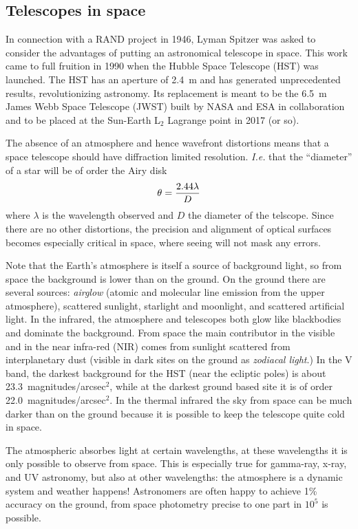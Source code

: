\subsection{Telescopes in space}

In connection with a RAND project in 1946, Lyman Spitzer was asked to consider the advantages
of putting an astronomical telescope in space. This work came to full fruition in 1990 
when the Hubble Space Telescope (HST) was launched. The HST has an aperture of 2.4~m and
has generated unprecedented results, revolutionizing astronomy. Its replacement is meant to
be the 6.5~m James Webb Space Telescope (JWST) built by NASA and ESA in collaboration and to
be placed at the Sun-Earth L$_2$ Lagrange point in 2017 (or so).

The absence of an atmosphere and hence wavefront distortions means that a space telescope 
should have diffraction limited resolution. {\it I.e.} that the ``diameter'' of a star will
be of order the Airy disk
\[
\theta={2.44\lambda\over D}
\]
where $\lambda$ is the wavelength observed and $D$ the diameter of the telscope. Since there
are no other distortions, the precision and alignment of optical surfaces becomes especially 
critical in space, where seeing will not mask any errors.

Note that the Earth's atmosphere is itself a source of background light, so from space the
background is lower than on the ground. On the ground there are several sources: {\it 
airglow} (atomic and molecular line emission from the upper atmosphere), scattered sunlight,
starlight and moonlight, and scattered artificial light. In the infrared, the atmosphere and
telescopes both glow like blackbodies and dominate the background. From space the main
contributor in the visible and in the near infra-red (NIR) comes from sunlight scattered from 
interplanetary dust (visible in dark sites on the ground as {\it zodiacal light}.) In the 
V band, the darkest background for the HST (near the ecliptic poles) is about 
23.3~magnitudes/arcsec$^2$, while at the darkest ground based site it is of order 
22.0~magnitudes/arcsec$^2$. In the thermal infrared the sky from space can be much darker than 
on the ground because it is possible to keep the telescope quite cold in space.

The atmospheric absorbes light at certain wavelengths, at these wavelengths it is only possible
to observe from space. This is especially true for gamma-ray, x-ray, and UV astronomy, but also
at other wavelengths: the atmosphere is a dynamic system and weather happens! Astronomers
are often happy to achieve 1\% accuracy on the ground, from space photometry precise to
one part in $10^5$ is possible.

